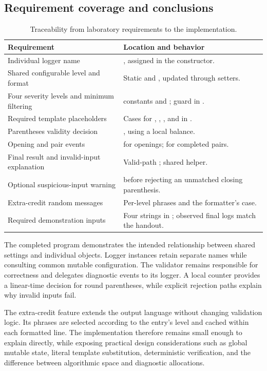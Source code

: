 \subsection{Requirement coverage and conclusions}
\begin{table}[H]
\centering\small
\begin{tabularx}{\textwidth}{@{}p{}Y@{}}
\toprule
\textbf{Requirement} & \textbf{Location and behavior}\\
\midrule
Individual logger name & , assigned in the constructor.\\
Shared configurable level and format & Static  and , updated through setters.\\
Four severity levels and minimum filtering &  constants and ; guard in .\\
Required template placeholders & Cases for , , , and  in .\\
Parentheses validity decision & , using a local balance.\\
Opening and pair events &  for openings;  for completed pairs.\\
Final result and invalid-input explanation & Valid-path ; shared  helper.\\
Optional suspicious-input warning &  before rejecting an unmatched closing parenthesis.\\
Extra-credit random messages & Per-level phrases and the formatter's  case.\\
Required demonstration inputs & Four strings in ; observed final logs match the handout.\\
\bottomrule
\end{tabularx}
\caption{Traceability from laboratory requirements to the implementation.}
\end{table}

The completed program demonstrates the intended relationship between shared settings and individual objects. Logger instances retain separate names while consulting common mutable configuration. The validator remains responsible for correctness and delegates diagnostic events to its logger. A local counter provides a linear-time decision for round parentheses, while explicit rejection paths explain why invalid inputs fail.

The extra-credit feature extends the output language without changing validation logic. Its phrases are selected according to the entry's level and cached within each formatted line. The implementation therefore remains small enough to explain directly, while exposing practical design considerations such as global mutable state, literal template substitution, deterministic verification, and the difference between algorithmic space and diagnostic allocations.
